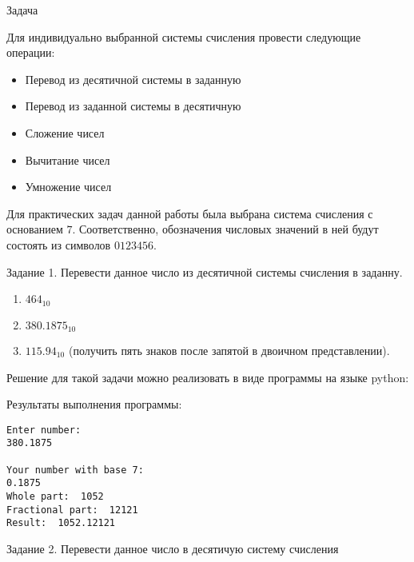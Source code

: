 \begin{center}
    Задача
\end{center}
Для индивидуально выбранной системы счисления провести следующие операции:
\begin{itemize}
    \item Перевод из десятичной системы в заданную
    \item Перевод из заданной системы в десятичную
    \item Сложение чисел
    \item Вычитание чисел
    \item Умножение чисел
\end{itemize}

Для практических задач данной работы была выбрана система счисления с основанием $7$. Соответственно, обозначения числовых значений в ней будут состоять из символов $0123456$.
\vspace{28pt}

Задание 1. Перевести данное число из десятичной системы счисления в заданну.
\begin{enumerate}
    \item $464_{10}$
    \item $380.1875_{10}$
    \item $115.94_{10}$ (получить пять знаков после запятой в двоичном представлении).
\end{enumerate}

Решение для такой задачи можно реализовать в виде программы на языке python:



Результаты выполнения программы:
\begin{lstlisting}
Enter number:
380.1875

Your number with base 7:
0.1875
Whole part:  1052
Fractional part:  12121
Result:  1052.12121
\end{lstlisting}

\vspace{28pt}
Задание 2. Перевести данное число в десятичую систему счисления
